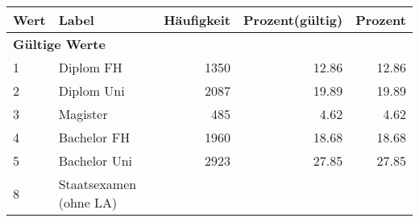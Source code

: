      \begin{longtable}{lXrrr}
     \toprule
     \textbf{Wert} & \textbf{Label} & \textbf{Häufigkeit} & \textbf{Prozent(gültig)} & \textbf{Prozent} \\
     \endhead
     \midrule
     \multicolumn{5}{l}{\textbf{Gültige Werte}}\\

     1 &
     \multicolumn{1}{X}{ Diplom FH   } &


       \num{1350} &
       \num[round-mode=places,round-precision=2]{12.86} &
         \num[round-mode=places,round-precision=2]{12.86} \\

     2 &
     \multicolumn{1}{X}{ Diplom Uni   } &


       \num{2087} &
       \num[round-mode=places,round-precision=2]{19.89} &
         \num[round-mode=places,round-precision=2]{19.89} \\

     3 &
     \multicolumn{1}{X}{ Magister   } &


       \num{485} &
       \num[round-mode=places,round-precision=2]{4.62} &
         \num[round-mode=places,round-precision=2]{4.62} \\

     4 &
     \multicolumn{1}{X}{ Bachelor FH   } &


       \num{1960} &
       \num[round-mode=places,round-precision=2]{18.68} &
         \num[round-mode=places,round-precision=2]{18.68} \\

     5 &
     \multicolumn{1}{X}{ Bachelor Uni   } &


       \num{2923} &
       \num[round-mode=places,round-precision=2]{27.85} &
         \num[round-mode=places,round-precision=2]{27.85} \\

     8 &
     \multicolumn{1}{X}{ Staatsexamen (ohne LA)   } &



\end{longtable}
